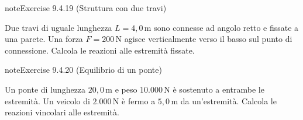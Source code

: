 \documentclass[letterpaper,10pt,italian]{jupyterBook}
\begin{document}
\begin{sphinxadmonition}{note}{Exercise 9.4.19 (Struttura con due travi)}



\sphinxAtStartPar
Due travi di uguale lunghezza \(L = 4,0 \, \text{m}\) sono connesse ad angolo retto e fissate a una parete. Una forza \(F = 200 \, \text{N}\) agisce verticalmente verso il basso sul punto di connessione. Calcola le reazioni alle estremità fissate.
\end{sphinxadmonition}
 \label{exercise:ch/mechanics/statics-problems-exercise-19}

\begin{sphinxadmonition}{note}{Exercise 9.4.20 (Equilibrio di un ponte)}



\sphinxAtStartPar
Un ponte di lunghezza \(20,0 \, \text{m}\) e peso \(10.000 \, \text{N}\) è sostenuto a entrambe le estremità. Un veicolo di \(2.000 \, \text{N}\) è fermo a \(5,0 \, \text{m}\) da un’estremità. Calcola le reazioni vincolari alle estremità.
\end{sphinxadmonition}
\end{document}
